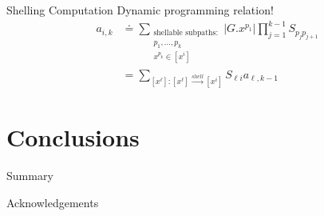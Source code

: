 \documentclass{beamer}
\begin{document}
\begin{frame}{Shelling Computation}
Dynamic programming relation! 
\begin{align}
a_{i,k} &\doteq \sum_{\substack{\text{shellable subpaths}:\\ p_1, \dots, p_k \\ x^{p_k} \in [x^i]}}|G.x^{p_1}|\prod_{j=1}^{k-1}S_{p_j p_{j+1}} \\  
&= \sum_{[x^\ell]:[x^\ell]\xrightarrow{shell}[x^i]} S_{\ell i} a_{\ell, k-1}
\end{align}

\end{frame}
\section{Conclusions}
\begin{frame}{Summary}
\end{frame}
\begin{frame}{Acknowledgements}
\end{frame}
\end{document}
